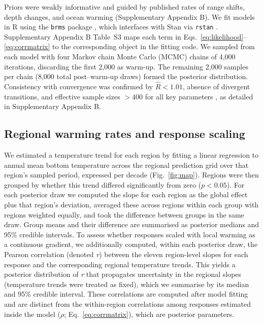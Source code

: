 \documentclass[9pt,twocolumn,twoside]{pnas-new}
\begin{document}
{Priors were weakly informative and guided by published rates of range shifts, depth changes, and ocean warming (Supplementary Appendix B). We fit models in R using the \texttt{brms} package \citep{burkner_brms_2017}, which interfaces with Stan via \texttt{rstan} \citep{stan2024,stan_development_team_rstan_2024}. Supplementary Appendix B Table~S3 maps each term in Eqs.~\ref{eq:likelihood}--\ref{eq:corrmatrix} to the corresponding object in the fitting code. We sampled from each model with four Markov chain Monte Carlo (MCMC) chains of 4,000 iterations, discarding the first 2,000 as warm-up. The remaining 2,000 samples per chain (8,000 total post–warm-up draws) formed the posterior distribution. Consistency with convergence was confirmed by $\hat{R} < 1.01$, absence of divergent transitions, and effective sample sizes $> 400$ for all key parameters \citep{vehtari_rank-normalization_2021}, as detailed in Supplementary Appendix B.

\subsection*{Regional warming rates and response scaling}
We estimated a temperature trend for each region by fitting a linear regression to annual mean bottom temperature across the regional prediction grid over that region's sampled period, expressed per decade (Fig.~\ref{fig:map}). Regions were then grouped by whether this trend differed significantly from zero ($p < 0.05$). For each posterior draw we computed the slope for each region as the global effect plus that region's deviation, averaged these across regions within each group with regions weighted equally, and took the difference between groups in the same draw. Group means and their difference are summarised as posterior medians and 95\% credible intervals. To assess whether responses scaled with local warming as a continuous gradient, we additionally computed, within each posterior draw, the Pearson correlation (denoted \textit{r}) between the eleven region-level slopes for each response and the corresponding regional temperature trends. This yields a posterior distribution of \textit{r} that propagates uncertainty in the regional slopes (temperature trends were treated as fixed), which we summarise by its median and 95\% credible interval. These correlations are computed after model fitting and are distinct from the within-region correlations among responses estimated inside the model ($\rho$; Eq.~\ref{eq:corrmatrix}), which are posterior parameters.
}
\end{document}
